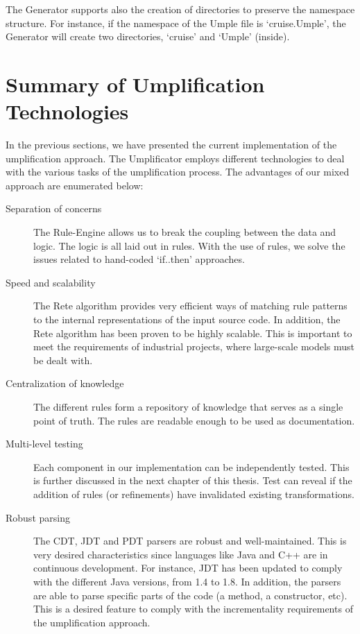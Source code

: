 The Generator supports also the creation of directories to preserve the namespace structure. For instance, if the namespace of the Umple file is `cruise.Umple', the Generator will create two directories, `cruise' and `Umple' (inside).

\section{Summary of Umplification Technologies}

In the previous sections, we have presented the current implementation of the umplification approach. The Umplificator employs different technologies to deal with the various tasks of the umplification process. 
The advantages of our mixed approach are enumerated below:

\begin{description}
\item [Separation of concerns] The Rule-Engine allows us to break the coupling between the data and logic. The logic is all laid out in rules. With the use of rules, we solve the issues related to hand-coded `if..then' approaches.

\item [Speed and scalability] The Rete algorithm provides very efficient ways of matching rule patterns to the internal representations of the input source code. In addition, the Rete algorithm has been proven to be highly scalable. This is important to meet the requirements of industrial projects, where large-scale models must be dealt with.

\item [Centralization of knowledge] The different rules form a repository of knowledge that serves as a single point of truth. The rules are readable enough to be used as documentation. 

\item [Multi-level testing] Each component in our implementation can be independently tested. This is further discussed in the next chapter of this thesis. Test can reveal if the addition of rules (or refinements) have invalidated existing transformations.

\item [Robust parsing] The CDT, JDT and PDT parsers are robust and well-maintained. This is very desired characteristics since languages like Java and C++ are in continuous development. For instance, JDT has been updated to comply with the different Java versions, from 1.4 to 1.8. In addition, the parsers are able to parse specific parts of the code (a method, a constructor, etc). This is a desired feature to comply with the incrementality requirements of the umplification approach. 


\end{description}
